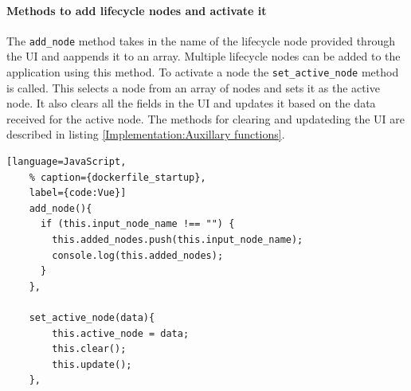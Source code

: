 \paragraph{Methods to add lifecycle nodes and activate it} The \lstinline{add_node} method takes in the name of the lifecycle node provided through the UI and aappends it to an array. Multiple lifecycle nodes can be added to the application using this method. To activate a node the \lstinline{set_active_node} method is called. This selects a node from an array of nodes and sets it as the active node. It also clears all the fields in the UI and updates it based on the data received for the active node. The methods for clearing and updateding the UI are described in listing \ref{Implementation:Auxillary functions}.
\begin{lstlisting}[language=JavaScript,
	% caption={dockerfile_startup}, 
	label={code:Vue}]
	add_node(){
	  if (this.input_node_name !== "") {
		this.added_nodes.push(this.input_node_name);
		console.log(this.added_nodes);
	  } 
	},

	set_active_node(data){
		this.active_node = data;
		this.clear();
		this.update();
	},
\end{lstlisting}


